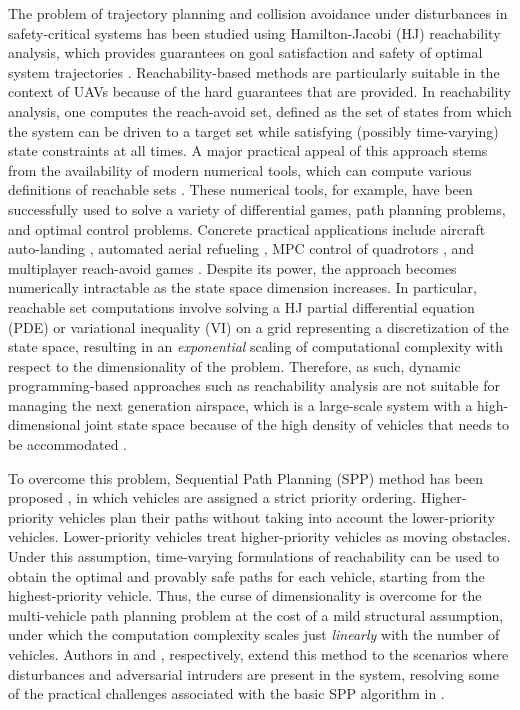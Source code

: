 The problem of trajectory planning and collision avoidance under disturbances in safety-critical systems has been studied using Hamilton-Jacobi (HJ) reachability analysis, which provides guarantees on goal satisfaction and safety of optimal system trajectories \cite{Barron90, Mitchell05, Bokanowski10, Bokanowski11, Margellos11, Fisac15}. Reachability-based methods are particularly suitable in the context of UAVs because of the hard guarantees that are provided. In reachability analysis, one computes the reach-avoid set, defined as the set of states from which the system can be driven to a target set while satisfying (possibly time-varying) state constraints at all times. A major practical appeal of this approach stems from the availability of modern numerical tools, which can compute various definitions of reachable sets \cite{Sethian96, Osher02, Mitchell02, Mitchell07b}. These numerical tools, for example, have been successfully used to solve a variety of differential games, path planning problems, and optimal control problems. Concrete practical applications include aircraft auto-landing \cite{Bayen07}, automated aerial refueling \cite{Ding08}, MPC control of quadrotors \cite{Bouffard12}, and multiplayer reach-avoid games \cite{Huang11}. Despite its power, the approach becomes numerically intractable as the state space dimension increases. In particular, reachable set computations involve solving a HJ partial differential equation (PDE) or variational inequality (VI) on a grid representing a discretization of the state space, resulting in an \textit{exponential} scaling of computational complexity with respect to the dimensionality of the problem. Therefore, as such, dynamic programming-based approaches such as reachability analysis are not suitable for managing the next generation airspace, which is a large-scale system with a high-dimensional joint state space because of the high density of vehicles that needs to be accommodated \cite{Kopardekar16}.  

To overcome this problem, Sequential Path Planning (SPP) method has been proposed \cite{Chen15c}, in which vehicles are assigned a strict priority ordering. Higher-priority vehicles plan their paths without taking into account the lower-priority vehicles. Lower-priority vehicles treat higher-priority vehicles as moving obstacles. Under this assumption, time-varying formulations of reachability \cite{Bokanowski11, Fisac15} can be used to obtain the optimal and provably safe paths for each vehicle, starting from the highest-priority vehicle. Thus, the curse of dimensionality is overcome for the multi-vehicle path planning problem at the cost of a mild structural assumption, under which the computation complexity scales just \textit{linearly} with the number of vehicles. Authors in \cite{Bansal2017} and \cite{chen2016robust}, respectively, extend this method to the scenarios where disturbances and adversarial intruders are present in the system, resolving some of the practical challenges associated with the basic SPP algorithm in \cite{Chen15c}. 

